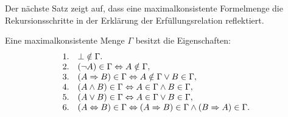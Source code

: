 \noindent
Der nächste Satz zeigt auf, dass eine maximalkonsistente Formelmenge
die Rekursionsschritte in der Erklärung der Erfüllungsrelation
reflektiert.

\begin{Satz}\label{maxkon-refl-sat}
Eine maximalkonsistente Menge $\Gamma$ besitzt die Eigenschaften:
\[\begin{array}{@{}ll}
1. & \bot\notin\Gamma.\\
2. & (\lnot A)\in\Gamma\bicond A\notin\Gamma,\\
3. & (A\cond B)\in\Gamma\bicond A\notin\Gamma\lor B\in\Gamma,\\
4. & (A\land B)\in\Gamma\bicond A\in\Gamma\land B\in\Gamma,\\
5. & (A\lor B)\in\Gamma\bicond A\in\Gamma\lor B\in\Gamma,\\
6. & (A\bicond B)\in\Gamma\bicond
  (A\cond B)\in\Gamma\land (B\cond A)\in\Gamma.
\end{array}\]
\end{Satz}
